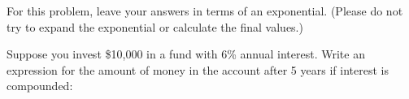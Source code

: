 \begin{questions}
\newpage
\question For this problem, leave your answers in terms of an exponential. (Please do not try to expand the exponential or calculate the final values.)

Suppose you invest \$10,000 in a fund with 6\% annual interest.  Write an expression for the amount of money in the account after 5 years if interest is compounded:

\end{questions}